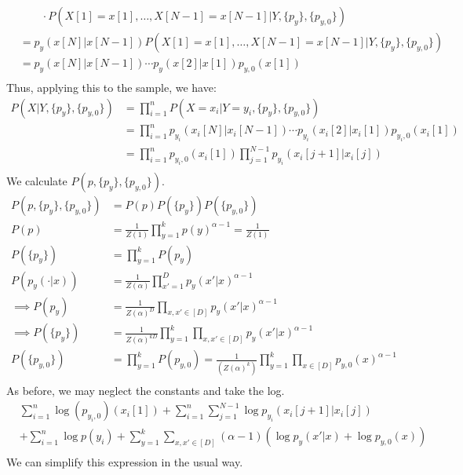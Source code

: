 \documentclass{amsart}
\theoremstyle{definition}
\begin{document}
\begin{enumerate}[(a)]
\begin{align*}
			&\qquad\cdot P(X[1] = x[1], \ldots, X[N-1] = x[N-1]| Y, \{p_y\}, \{p_{y, 0}\})\\
			&= p_{y}(x[N]|x[N-1])P(X[1] = x[1], \ldots, X[N-1] = x[N-1]| Y, \{p_y\}, \{p_{y, 0}\})\\
			&= p_{y}(x[N]|x[N-1])\cdots p_{y}(x[2]|x[1])p_{y, 0}(x[1])\\
		\end{align*}
		Thus, applying this to the sample, we have:
		\begin{align*}
			P(X|Y, \{p_y\}, \{p_{y, 0}\}) &= \prod_{i=1}^{n} P(X = x_i|Y = y_i, \{p_y\}, \{p_{y, 0}\})\\
			&= \prod_{i=1}^{n} p_{y_i}(x_i[N]|x_i[N-1])\cdots p_{y_i}(x_i[2]|x_i[1])p_{y_i, 0}(x_i[1])\\
			&= \prod_{i=1}^{n} p_{y_i, 0}(x_i[1])\prod_{j=1}^{N-1} p_{y_i}(x_i[j + 1]|x_i[j])\\
		\end{align*}
		We calculate $P(p, \{p_y\}, \{p_{y, 0}\})$.
		\begin{align*}
			P(p, \{p_y\}, \{p_{y, 0}\}) &= P(p)P(\{p_y\})P(\{p_{y, 0}\})\\
			P(p) &= \frac{1}{Z(1)}\prod_{y=1}^{k} p(y)^{\alpha - 1} = \frac{1}{Z(1)}\\
			P(\{p_y\}) &= \prod_{y=1}^{k} P(p_y)\\
			P(p_y(\cdot |x))&=\frac{1}{Z(\alpha)}\prod_{x' = 1}^{D} p_y(x'|x)^{\alpha - 1}\\
			\implies P(p_y) &= \frac{1}{Z(\alpha)^D} \prod_{x, x' \in [D]} p_y(x'|x)^{\alpha - 1}\\
			\implies P(\{p_y\}) &= \frac{1}{Z(\alpha)^{kD}} \prod_{y=1}^{k}\prod_{x, x' \in [D]} p_y(x'|x)^{\alpha - 1}\\
			P(\{p_{y, 0}\}) &= \prod_{y=1}^{k} P(p_{y, 0}) = \frac{1}{(Z(\alpha)^k)}\prod_{y=1}^{k} \prod_{x \in [D]} p_{y, 0}(x)^{\alpha - 1}\\
		\end{align*}
		As before, we may neglect the constants and take the log.
		\begin{align*}
			&\sum_{i = 1}^{n}\log(p_{y_i, 0})(x_i[1]) + \sum_{i = 1}^{n}\sum_{j = 1}^{N-1}\log p_{y_i}(x_i[j + 1]|x_i[j])\\
			&+ \sum_{i=1}^{n} \log p(y_i) + \sum_{y=1}^{k}\sum_{x, x' \in [D]} (\alpha - 1) (\log p_y(x'|x) + \log p_{y, 0}(x))\\
		\end{align*}
		We can simplify this expression in the usual way.
		\begin{align*}

\end{align*}
\end{enumerate}
\end{document}
